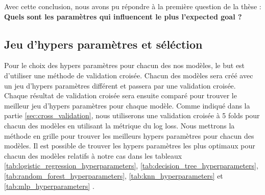\documentclass[12pt]{article}
\begin{document}
Avec cette conclusion, nous avons pu répondre à la première question de la thèse : \newline\textbf{Quels sont les paramètres qui influencent le plus l’expected goal ?}


\subsection{Jeu d'hypers paramètres et séléction}
Pour le choix des hypers paramètres pour chacun des nos modèles, le but est d'utiliser une méthode de validation croisée.
Chacun des modèles sera créé avec un jeu d'hypers paramètres différent et passera par une validation croisée.
Chaque résultat de validation croisée sera ensuite comparé pour trouver le meilleur jeu d'hypers paramètres pour chaque modèle.
Comme indiqué dans la partie \ref{sec:cross_validation}, nous utiliserons une validation croisée à 5 folds pour chacun des modèles en utilisant la métrique du log loss.
Nous mettrons la méthode en grille pour trouver les meilleurs hypers paramètres pour chacun des modèles.
Il est possible de trouver les hypers paramètres les plus optimaux pour chacun des modèles relatifs à notre cas dans les tableaux \ref{tab:logistic_regression_hyperparameters}, \ref{tab:decision_tree_hyperparameters}, \ref{tab:random_forest_hyperparameters}, \ref{tab:knn_hyperparameters} et \ref{tab:mlp_hyperparameters} .
\end{document}
